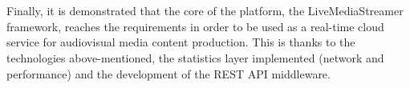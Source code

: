 \documentclass[english,final]{setup/eetac_tfc_pfc}
\begin{document}
\begin{overview}{11cm}
  \\
  \\
  Finally, it is demonstrated that the core of the platform, the LiveMediaStreamer framework, reaches the requirements in order to be used as a real-time cloud service for audiovisual media content production. This is thanks to the technologies above-mentioned, the statistics layer implemented (network and performance) and the development of the REST API middleware.

\end{overview}





\afterpreface




%         











\end{document}
